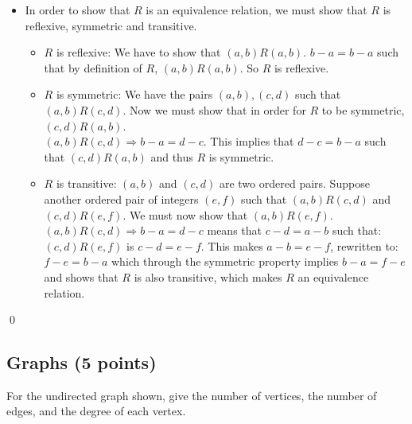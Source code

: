 \documentclass[12pt]{article}
\begin{document}
\begin{enumerate}[a)]
  \begin{itemize}
  \item In order to show that $R$ is an equivalence relation, we must show that $R$ is reflexive, symmetric and transitive.
    \begin{itemize}
    \item $R$ is reflexive: We have to show that $(a,b)R(a,b)$. $b - a = b - a$ such that by definition of $R$, $(a,b)R(a,b)$. So $R$ is reflexive.
    \item $R$ is symmetric: We have the pairs $(a,b),(c,d)$ such that $(a,b)R(c,d)$. Now we must show that in order for $R$ to be symmetric,
      $(c,d)R(a,b)$. \\
      $(a,b)R(c,d)\Rightarrow b-a=d-c$. This implies that $d-c=b-a$ such that $(c,d)R(a,b)$ and thus $R$ is symmetric.
    \item $R$ is transitive: $(a,b)$ and $(c,d)$ are two ordered pairs. Suppose another ordered pair of integers $(e,f)$ such that $(a,b)R(c,d)$ and $(c,d)R(e,f)$.  We must now show that $(a,b)R(e,f)$. \\
      $(a,b)R(c,d) \Rightarrow b - a = d -c $ means that $c - d = a - b$ such that: \\ $(c,d)R(e,f)$ is $c - d = e - f$. This makes $a - b = e - f$, rewritten to:\\
      $f - e  = b - a$ which through the symmetric property implies $b - a = f - e$ and shows that $R$ is also transitive, which makes $R$ an equivalence relation. 
    \end{itemize}
  \end{itemize}
\end{enumerate}

\qed 
\bigskip
\newpage


\subsection{Graphs (5 points)}
\label{sec:graphs}

For the undirected graph shown, give the number of vertices, the
  number of edges, and the degree of each vertex.

  \begin{center}
  \end{center}
\end{document}
